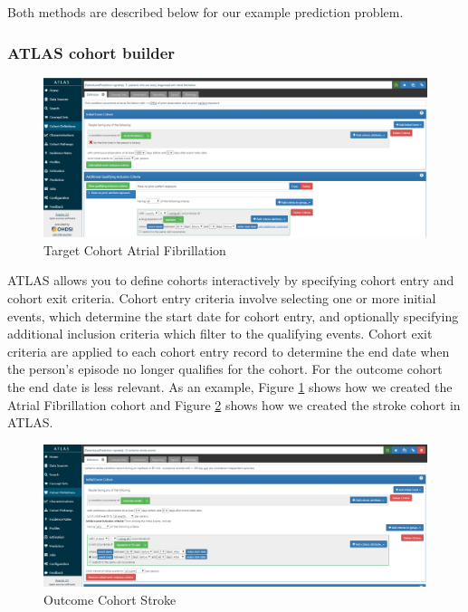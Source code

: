 \documentclass[]{book}
\begin{document}
Both methods are described below for our example prediction problem.

\subsubsection{ATLAS cohort builder}\label{atlas-cohort-builder}

\begin{figure}
\includegraphics[width=1\linewidth]{images/PatientLevelPrediction/atlast} \caption{Target Cohort Atrial Fibrillation}\label{fig:atlast}
\end{figure}

ATLAS allows you to define cohorts interactively by specifying cohort
entry and cohort exit criteria. Cohort entry criteria involve selecting
one or more initial events, which determine the start date for cohort
entry, and optionally specifying additional inclusion criteria which
filter to the qualifying events. Cohort exit criteria are applied to
each cohort entry record to determine the end date when the person's
episode no longer qualifies for the cohort. For the outcome cohort the
end date is less relevant. As an example, Figure \ref{fig:atlast} shows
how we created the Atrial Fibrillation cohort and Figure
\ref{fig:atlaso} shows how we created the stroke cohort in ATLAS.

\begin{figure}
\includegraphics[width=1\linewidth]{images/PatientLevelPrediction/atlaso} \caption{Outcome Cohort Stroke}\label{fig:atlaso}
\end{figure}
\end{document}
